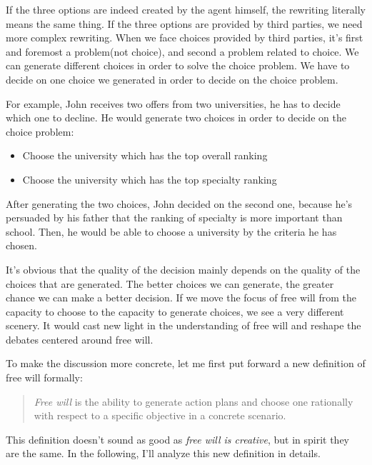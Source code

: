 If the three options are indeed created by the agent himself, the rewriting literally means the same thing. If the three options are provided by third parties, we need more complex rewriting. When we face choices provided by third parties, it's first and foremost a problem(not choice), and second a problem related to choice. We can generate different choices in order to solve the choice problem. We have to decide on one choice we generated in order to decide on the choice problem.

For example, John receives two offers from two universities, he has to decide which one to decline. He would generate two choices in order to decide on the choice problem:

\begin{itemize}
\item Choose the university which has the top overall ranking
\item Choose the university which has the top specialty ranking
\end{itemize}

After generating the two choices, John decided on the second one, because he's persuaded by his father that the ranking of specialty is more important than school. Then, he would be able to choose a university by the criteria he has chosen.

It's obvious that the quality of the decision mainly depends on the quality of the choices that are generated. The better choices we can generate, the greater chance we can make a better decision. If we move the focus of free will from the capacity to choose to the capacity to generate choices, we see a very different scenery. It would cast new light in the understanding of free will and reshape the debates centered around free will.

To make the discussion more concrete, let me first put forward a new definition of free will formally:

\begin{quote}
\emph{Free will} is the ability to generate action plans and choose one rationally with respect to a specific objective in a concrete scenario.

\end{quote}

This definition doesn't sound as good as \emph{free will is creative}, but in spirit they are the same. In the following, I'll analyze this new definition in details.

